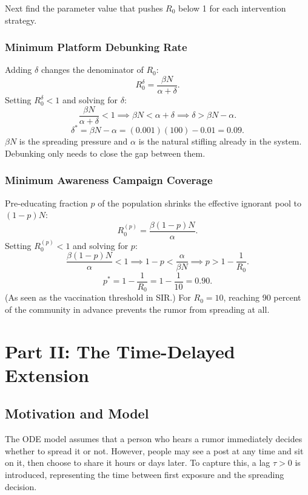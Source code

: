 \documentclass[12pt]{article}
\begin{document}
Next find the parameter value that pushes
$R_0$ below 1 for each intervention strategy.

\subsubsection{Minimum Platform Debunking Rate}

Adding $\delta$ changes the denominator of $R_0$:
$$R_0^\delta = \frac{\beta N}{\alpha + \delta}.$$
Setting $R_0^\delta < 1$ and solving for $\delta$:
$$\frac{\beta N}{\alpha + \delta} < 1 \implies \beta N < \alpha + \delta
\implies \delta > \beta N - \alpha.$$
\begin{equation*}
\boxed{\delta^* = \beta N - \alpha = (0.001)(100) - 0.01 = 0.09.}
\end{equation*}
$\beta N$ is the spreading pressure and $\alpha$ is the natural stifling
already in the system. Debunking only needs to close the gap between them.

\subsubsection{Minimum Awareness Campaign Coverage}

Pre-educating fraction $p$ of the population shrinks the effective ignorant
pool to $(1-p)N$:
$$R_0^{(p)} = \frac{\beta(1-p)N}{\alpha}.$$
Setting $R_0^{(p)} < 1$ and solving for $p$:
$$\frac{\beta(1-p)N}{\alpha} < 1 \implies 1 - p < \frac{\alpha}{\beta N}
\implies p > 1 - \frac{1}{R_0}.$$
\begin{equation*}
\boxed{p^* = 1 - \frac{1}{R_0} = 1 - \frac{1}{10} = 0.90.}
\end{equation*}
(As seen as the vaccination threshold in SIR.) For $R_0 = 10$,
reaching 90 percent of the community in advance prevents the rumor from
spreading at all.

\section{Part II: The Time-Delayed Extension}

\subsection{Motivation and Model}

The ODE model assumes that a person who hears a rumor immediately decides
whether to spread it or not. However, people may see
a post at any time and sit on it, then choose to share it hours or days later. To capture this,
a lag $\tau > 0$ is introduced, representing the time between
first exposure and the spreading decision.
\end{document}
